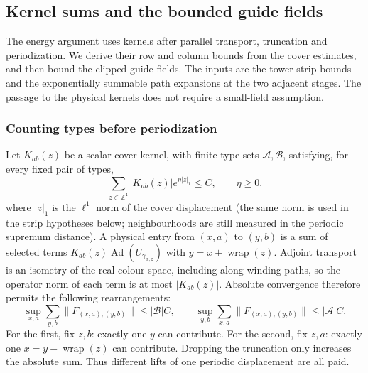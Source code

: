 \subsection{Kernel sums and the bounded guide fields}
\label{sec:seed-guides}
The energy argument uses kernels after parallel transport, truncation
and periodization. We derive their row and column bounds from the
cover estimates, and then bound the clipped guide fields. The inputs
are the tower strip bounds and the exponentially summable path
expansions at the two adjacent stages. The passage to the physical
kernels does not require a small-field assumption.

\subsubsection{Counting types before periodization}
Let $K_{ab}(z)$ be a scalar cover kernel, with finite type sets
$\mathcal A,\mathcal B$, satisfying, for every fixed pair of types,
\[
 \sum_{z\in\mathbb Z^4}|K_{ab}(z)|e^{\eta|z|_1}\le C,
 \qquad \eta\ge0.
\]
where $|z|_1$ is the $\ell^1$ norm of the cover displacement (the
same norm is used in the strip hypotheses below; neighbourhoods are
still measured in the periodic supremum distance).
A physical entry from $(x,a)$ to $(y,b)$ is a sum of selected terms
$K_{ab}(z)\operatorname{Ad}(U_{\gamma_{x,z}})$ with
$y=x+\operatorname{wrap}(z)$. Adjoint transport is an isometry of the
real colour space, including along winding paths, so the operator
norm of each term is at most $|K_{ab}(z)|$. Absolute convergence
therefore permits the following rearrangements:
\begin{equation}\label{eq:guide-periodic-rows}
 \sup_{x,a}\sum_{y,b}\|F_{(x,a),(y,b)}\|\le|\mathcal B|C,
 \qquad
 \sup_{y,b}\sum_{x,a}\|F_{(x,a),(y,b)}\|\le|\mathcal A|C.
\end{equation}
For the first, fix $z,b$: exactly one $y$ can contribute. For the
second, fix $z,a$: exactly one $x=y-\operatorname{wrap}(z)$ can
contribute. Dropping the truncation only increases the absolute sum.
Thus different lifts of one periodic displacement are all paid.

